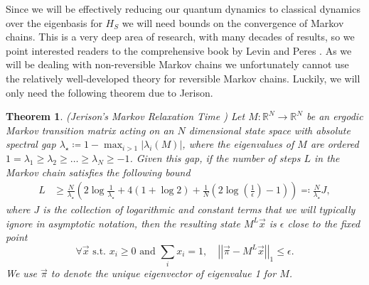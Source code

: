 \documentclass[
 amsmath,amssymb,
 aps,
onecolumn, 
nofootinbib]{revtex4-2}
\newtheorem{theorem}{Theorem}
\newcommand{\norm}[1]{\left|\left| #1 \right|\right|}
\begin{document}
Since we will be effectively reducing our quantum dynamics to classical dynamics over the eigenbasis for $H_S$ we will need bounds on the convergence of Markov chains. This is a very deep area of research, with many decades of results, so we point interested readers to the comprehensive book by Levin and Peres \cite{levin2017markov}. As we will be dealing with non-reversible Markov chains we unfortunately cannot use the relatively well-developed theory for reversible Markov chains. Luckily, we will only need the following theorem due to Jerison.
\begin{theorem}(Jerison's Markov Relaxation Time \cite{jerison2013general}) \label{thm:markov_chain_bound}
    Let $M : \mathbb{R}^{N} \to  \mathbb{R}^{N}$ be an ergodic Markov transition matrix acting on an $N$ dimensional state space with absolute spectral gap $\lambda_{\star} \coloneqq 1 - \max_{i > 1} |\lambda_i(M)|$, where the eigenvalues of $M$ are ordered $1 = \lambda_1 \ge \lambda_2 \ge \ldots \ge \lambda_N \geq -1$. Given this gap, if the number of steps $L$ in the Markov chain satisfies the following bound
    \begin{align}
        L &\ge \frac{N}{\lambda_{\star}} \left( 2\log \frac{1}{\lambda_{\star}} + 4(1 + \log 2) +  \frac{1}{N} (2 \log \left( \frac{1}{\epsilon} \right) - 1) \right) \eqqcolon \frac{N}{\lambda_\star} J,
    \end{align}
    where $J$ is the collection of logarithmic and constant terms that we will typically ignore in asymptotic notation, then the resulting state $M^L \vec{x}$ is $\epsilon$ close to the fixed point
    \begin{equation}
        \forall \vec{x} \text{ s.t. } x_i \ge 0 \text{ and } \sum_i x_i = 1, \quad \norm{\vec{\pi} - M^L \vec{x}}_1 \le \epsilon.
    \end{equation}
    We use $\vec{\pi}$ to denote the unique eigenvector of eigenvalue 1 for $M$.
\end{theorem}
\end{document}

